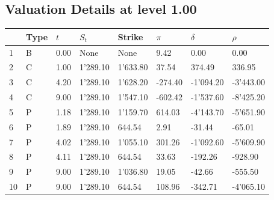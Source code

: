 \documentclass[12pt]{article}
\begin{document}
\begin{center} 
 \subsection{Valuation Details at level 1.00} 
 \par 
 \begin{scriptsize} 
 \begin{tabular}{p{13.1 mm}|p{13.1 mm}|p{13.1 mm}|p{13.1 mm}|p{13.1 mm}|p{13.1 mm}|p{13.1 mm}|p{13.1 mm}} 
          &     Type &      $t$ &    $S_t$ &   Strike &    $\pi$ & $\delta$ &   $\rho$ \\ \hline 
1 & B& 0.00& None& None& 9.42& 0.00& 0.00\\ 
2 & C& 1.00& 1'289.10& 1'633.80& 37.54& 374.49& 336.95\\ 
3 & C& 4.20& 1'289.10& 1'628.20& -274.40& -1'094.20& -3'443.00\\ 
4 & C& 9.00& 1'289.10& 1'547.10& -602.42& -1'537.60& -8'425.20\\ 
5 & P& 1.18& 1'289.10& 1'159.70& 614.03& -4'143.70& -5'651.90\\ 
6 & P& 1.89& 1'289.10& 644.54& 2.91& -31.44& -65.01\\ 
7 & P& 4.02& 1'289.10& 1'055.10& 301.26& -1'092.60& -5'609.90\\ 
8 & P& 4.11& 1'289.10& 644.54& 33.63& -192.26& -928.90\\ 
9 & P& 9.00& 1'289.10& 1'036.80& 19.05& -42.66& -555.50\\ 
10 & P& 9.00& 1'289.10& 644.54& 108.96& -342.71& -4'065.10\\ 
\end{tabular} 
  \end{scriptsize} 
 \end{center}%
\end{document}
